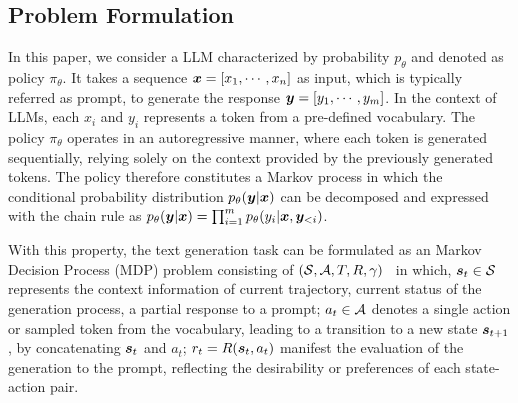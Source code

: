 \subsection{Problem Formulation}

In this paper, we consider a LLM characterized by probability $p_\theta$ and denoted as policy $\pi_\theta$. It takes a sequence ${\bm{x}} =[x_1, \cdots, x_n]$ as input, which is typically referred as prompt, to generate the response ${\bm{y}} = [y_1, \cdots, y_m]$. In the context of LLMs, each $x_i$ and $y_i$ represents a token from a pre-defined vocabulary. The policy $\pi_\theta$ operates in an autoregressive manner, where each token is generated sequentially, relying solely on the context provided by the previously generated tokens. The policy therefore constitutes a Markov process in which the conditional probability distribution $p_\theta({\bm{y}}|{\bm{x}})$ can be decomposed and expressed with the chain rule as $p_\theta({\bm{y}}|{\bm{x}}) = \prod_{i=1}^{m} p_{\theta}(y_i|{\bm{x}}, {\bm{y}}_{<i})$.

With this property, the text generation task can be formulated as an Markov Decision Process (MDP) problem consisting of $({\mathcal{S}}, {\mathcal{A}}, T, R, \gamma)$~\cite{} in which, ${\bm{s}}_t \in {\mathcal{S}}$ represents the context information of current trajectory, \ie current status of the generation process, \eg a partial response to a prompt; $a_t \in {\mathcal{A}}$ denotes a single action or sampled token from the vocabulary, leading to a transition to a new state ${\bm{s}}_{t+1}$, by concatenating ${\bm{s}}_t$ and $a_t$; $r_t = R({\bm{s}}_t, a_t)$ manifest the evaluation of the generation to the prompt, reflecting the desirability or preferences of each state-action pair.



